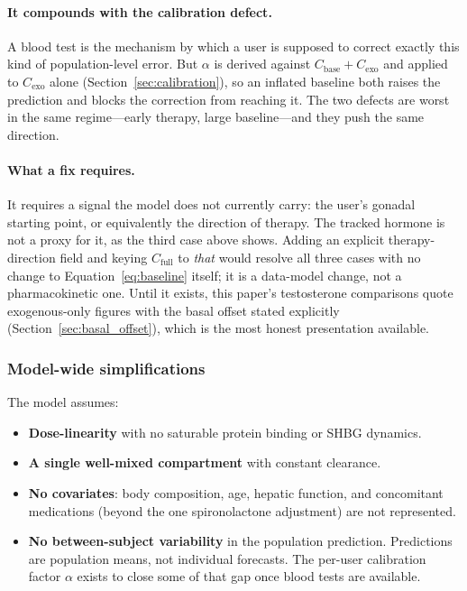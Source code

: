 \documentclass[11pt,a4paper]{article}
\begin{document}
\paragraph{It compounds with the calibration defect.} A blood test is the
mechanism by which a user is supposed to correct exactly this kind of
population-level error. But $\alpha$ is derived against
$C_{\text{base}} + C_{\text{exo}}$ and applied to $C_{\text{exo}}$ alone
(Section~\ref{sec:calibration}), so an inflated baseline both raises the
prediction and blocks the correction from reaching it. The two defects are
worst in the same regime---early therapy, large baseline---and they push the
same direction.

\paragraph{What a fix requires.} It requires a signal the model does not
currently carry: the user's gonadal starting point, or equivalently the
direction of therapy. The tracked hormone is not a proxy for it, as the
third case above shows. Adding an explicit therapy-direction field and
keying $C_{\text{full}}$ to \emph{that} would resolve all three cases with
no change to Equation~\ref{eq:baseline} itself; it is a data-model change,
not a pharmacokinetic one. Until it exists, this paper's testosterone
comparisons quote exogenous-only figures with the basal offset stated
explicitly (Section~\ref{sec:basal_offset}), which is the most honest
presentation available.

\subsubsection{Model-wide simplifications}
\label{sec:simplifications}

The model assumes:
\begin{itemize}[nosep,leftmargin=1.4em]
\item \textbf{Dose-linearity} with no saturable protein binding or SHBG
  dynamics.
\item \textbf{A single well-mixed compartment} with constant clearance.
\item \textbf{No covariates}: body composition, age, hepatic function,
  and concomitant medications (beyond the one spironolactone adjustment)
  are not represented.
\item \textbf{No between-subject variability} in the population
  prediction. Predictions are population means, not individual
  forecasts. The per-user calibration factor $\alpha$ exists to close
  some of that gap once blood tests are available.
\end{itemize}
\end{document}

